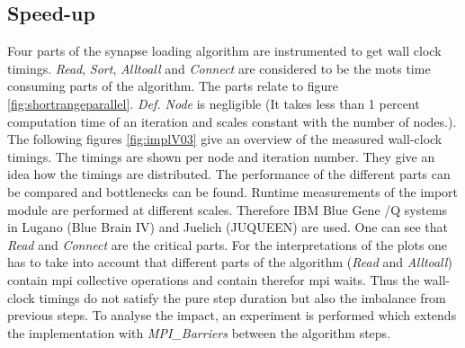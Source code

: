\subsection{Speed-up}
Four parts of the synapse loading algorithm are instrumented to get wall clock timings.
\emph{Read}, \emph{Sort}, \emph{Alltoall} and \emph{Connect} are considered to be the mots time
consuming parts of the algorithm. The parts relate to figure \ref{fig:shortrangeparallel}.
\emph{Def. Node} is negligible (It takes less than 1 percent computation time of an iteration and scales constant with the number of nodes.).
The following figures \ref{fig:implV03} give an overview of the measured wall-clock timings.
The timings are shown per node and iteration number. They give an idea how the timings are distributed.
The performance of the different parts can be compared and bottlenecks can be found.
Runtime measurements of the import module are performed at different scales.
Therefore IBM Blue Gene /Q systems in Lugano (Blue Brain IV) and Juelich (JUQUEEN) are used.
One can see that \emph{Read} and \emph{Connect} are the critical parts.
For the interpretations of the plots one has to take into account that different parts of the algorithm
(\emph{Read} and \emph{Alltoall}) contain mpi collective operations and contain therefor mpi waits.
Thus the wall-clock timings do not satisfy the pure step duration but also the imbalance from previous steps.
To analyse the impact, an experiment is performed which extends the implementation with \emph{MPI\_Barriers}
between the algorithm steps.
\newpage
